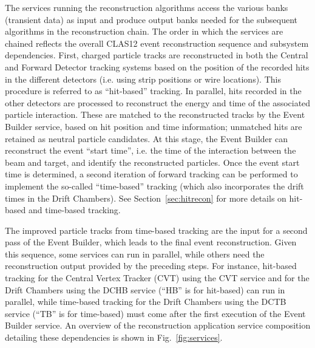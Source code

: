 The services running the reconstruction algorithms access the various banks (transient data) as input and produce
output banks needed for the subsequent algorithms in the reconstruction chain. The order in which the services are
chained reflects the overall CLAS12 event reconstruction sequence and subsystem dependencies. First, charged
particle tracks are reconstructed in both the Central and Forward Detector tracking systems based on the position
of the recorded hits in the different detectors (i.e. using strip positions or wire locations). This procedure is
referred to as ``hit-based'' tracking. In parallel, hits recorded in the other detectors are processed to reconstruct
the energy and time of the associated particle interaction. These are matched to the reconstructed tracks by the
Event Builder service, based on hit position and time information; unmatched hits are retained as neutral particle
candidates. At this stage, the Event Builder can reconstruct the event ``start time'', i.e. the time of the interaction
between the beam and target, and identify the reconstructed particles. Once the event start time is determined, a
second iteration of forward tracking can be performed to implement the so-called ``time-based'' tracking (which
also incorporates the drift times in the Drift Chambers). See Section~\ref{sec:hitrecon} for more details on
hit-based and time-based tracking.

The improved particle tracks from time-based tracking are the input for a second pass of the Event Builder, which
leads to the final event reconstruction. Given this sequence, some services can run in parallel, while others need the
reconstruction output provided by the preceding steps. For instance, hit-based tracking for the Central Vertex
Tracker (CVT) using the CVT service and for the Drift Chambers using the DCHB service (``HB'' is for hit-based)
can run in parallel, while time-based tracking for the Drift Chambers using the DCTB service (``TB'' is for time-based)
must come after the first execution of the Event Builder service. An overview of the reconstruction application service
composition detailing these dependencies is shown in Fig.~\ref{fig:services}.
